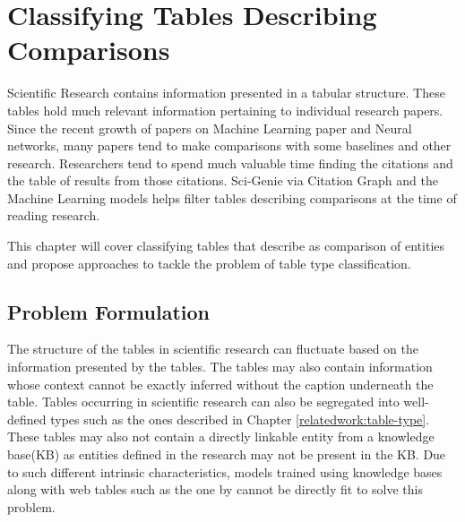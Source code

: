 \chapter{Classifying Tables Describing Comparisons}
\label{table_classification}
Scientific Research contains information presented in a tabular structure. These tables hold much relevant information pertaining to individual research papers. Since the recent growth of papers on Machine Learning paper and  Neural networks, many papers tend to make comparisons with some baselines and other research. Researchers tend to spend much valuable time finding the citations and the table of results from those citations. Sci-Genie via Citation Graph and the Machine Learning models helps filter tables describing comparisons at the time of reading research. 

This chapter will cover classifying tables that describe as comparison of entities and propose approaches to tackle the problem of table type classification. 

\section{Problem Formulation}

The structure of the tables in scientific research can fluctuate based on the information presented by the tables. The tables may also contain information whose context cannot be exactly inferred without the caption underneath the table. Tables occurring in scientific research can also be segregated into well-defined types such as the ones described in Chapter \ref{relatedwork:table-type}. These tables may also not contain a directly linkable entity from a knowledge base(KB) as entities defined in the research may not be present in the KB. Due to such different intrinsic characteristics, models trained using knowledge bases along with web tables such as the one by \cite{deng2020turl} cannot be directly fit to solve this problem. 


